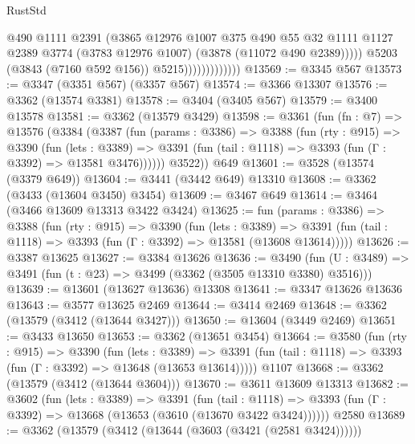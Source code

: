 \begin{lexlean}{RustStd}
\begin{coremodule}
                                  @490
                                  @1111
                                  @2391
                                  (@3865
                                    @12976
                                    @1007
                                    @375
                                    @490
                                    @55
                                    @32
                                    @1111
                                    @1127
                                    @2389
                                    @3774
                                    (@3783 @12976 @1007)
                                    (@3878 (@11072 @490 @2389)))))
                              @5203
                              (@3843 (@7160 @592 @156))
                              @5215)))))))))))))
@13569 := @3345 @567
@13573 := @3347 (@3351 @567) (@3357 @567)
@13574 := @3366 @13307
@13576 := @3362 (@13574 @3381)
@13578 := @3404 (@3405 @567)
@13579 := @3400 @13578
@13581 := @3362 (@13579 @3429)
@13598 := @3361
    (fun (fn : @7) =>
    @13576
      (@3384
        (@3387
          (fun (params : @3386) =>
          @3388
            (fun (rty : @915) =>
            @3390
              (fun (lets : @3389) =>
              @3391 (fun (tail : @1118) => @3393 (fun (Γ : @3392) => @13581 @3476))))))
        @3522))
    @649
@13601 := @3528 (@13574 (@3379 @649))
@13604 := @3441 (@3442 @649) @13310
@13608 := @3362 (@3433 (@13604 @3450) @3454)
@13609 := @3467 @649
@13614 := @3464 (@3466 @13609 @13313 @3422 @3424)
@13625 := fun (params : @3386) =>
  @3388
    (fun (rty : @915) =>
    @3390
      (fun (lets : @3389) =>
      @3391 (fun (tail : @1118) => @3393 (fun (Γ : @3392) => @13581 (@13608 @13614)))))
@13626 := @3387 @13625
@13627 := @3384 @13626
@13636 := @3490
    (fun (U : @3489) => @3491 (fun (t : @23) => @3499 (@3362 (@3505 @13310 @3380) @3516)))
@13639 := @13601 (@13627 @13636) @13308
@13641 := @3347 @13626 @13636
@13643 := @3577 @13625 @2469
@13644 := @3414 @2469
@13648 := @3362 (@13579 (@3412 (@13644 @3427)))
@13650 := @13604 (@3449 @2469)
@13651 := @3433 @13650
@13653 := @3362 (@13651 @3454)
@13664 := @3580
    (fun (rty : @915) =>
    @3390
      (fun (lets : @3389) =>
      @3391 (fun (tail : @1118) => @3393 (fun (Γ : @3392) => @13648 (@13653 @13614)))))
    @1107
@13668 := @3362 (@13579 (@3412 (@13644 @3604)))
@13670 := @3611 @13609 @13313
@13682 := @3602
    (fun (lets : @3389) =>
    @3391
      (fun (tail : @1118) =>
      @3393 (fun (Γ : @3392) => @13668 (@13653 (@3610 (@13670 @3422 @3424))))))
    @2580
@13689 := @3362 (@13579 (@3412 (@13644 (@3603 (@3421 (@2581 @3424))))))

\end{coremodule}
\end{lexlean}
